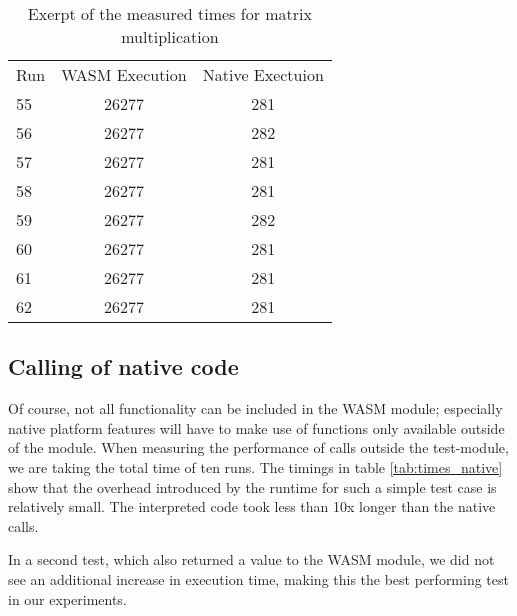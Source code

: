 \begin{table} [h]
    \begin{tabular}{l c c}
        Run & WASM Execution & Native Exectuion \\
        55  & 26277          & 281              \\
        56  & 26277          & 282              \\
        57  & 26277          & 281              \\
        58  & 26277          & 281              \\
        59  & 26277          & 282              \\
        60  & 26277          & 281              \\
        61  & 26277          & 281              \\
        62  & 26277          & 281              \\
    \end{tabular}
    \caption{Exerpt of the measured times for matrix multiplication}
    \label{tab:times_matrix}
\end{table}

\subsection{Calling of native code}

Of course, not all functionality can be included in the WASM module; especially native platform features will have to make use of functions only available outside of the module. When measuring the performance of calls outside the test-module, we are taking the total time of ten runs. The timings in table \ref{tab:times_native} show that the overhead introduced by the runtime for such a simple test case is relatively small. The interpreted code took less than 10x longer than the native calls.

In a second test, which also returned a value to the WASM module, we did not see an additional increase in execution time, making this the best performing test in our experiments.

